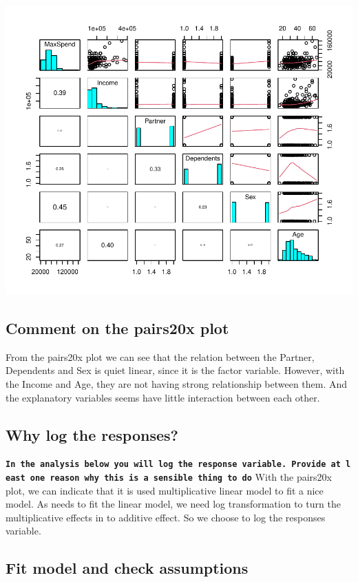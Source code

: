 \documentclass[
]{article}
\begin{document}
\includegraphics{STATS201_2022_SWU_A3_files/figure-latex/unnamed-chunk-2-1.pdf}

\hypertarget{comment-on-the-pairs20x-plot}{%
\subsection{Comment on the pairs20x
plot}\label{comment-on-the-pairs20x-plot}}

From the pairs20x plot we can see that the relation between the Partner,
Dependents and Sex is quiet linear, since it is the factor variable.
However, with the Income and Age, they are not having strong
relationship between them. And the explanatory variables seems have
little interaction between each other.

\hypertarget{why-log-the-responses}{%
\subsection{Why log the responses?}\label{why-log-the-responses}}

\textbf{\texttt{In\ the\ analysis\ below\ you\ will\ log\ the\ response\ variable.\ Provide\ at\ least\ one\ reason\ why\ this\ is\ a\ sensible\ thing\ to\ do}}
With the pairs20x plot, we can indicate that it is used multiplicative
linear model to fit a nice model. As needs to fit the linear model, we
need log transformation to turn the multiplicative effects in to
additive effect. So we choose to log the responses variable.

\hypertarget{fit-model-and-check-assumptions}{%
\subsection{Fit model and check
assumptions}\label{fit-model-and-check-assumptions}}
\end{document}
